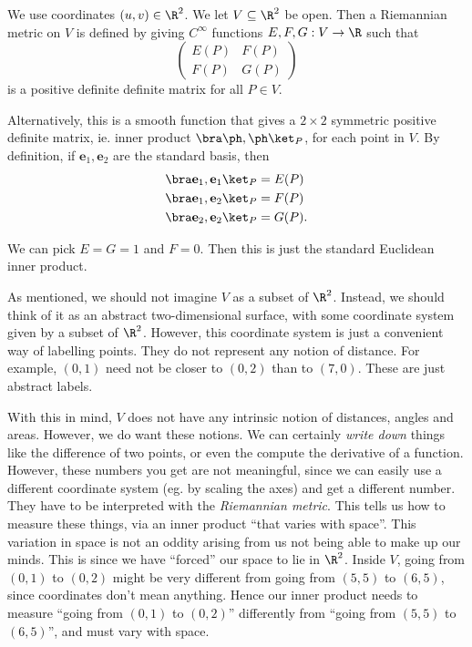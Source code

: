 \documentclass[a4paper]{article}
\begin{document}
\begin{defi}
  We use coordinates $(u, v) \in \R^2$. We let $V \subseteq \R^2$ be open. Then a Riemannian metric on $V$ is defined by giving $C^{\infty}$ functions $E, F, G: V \to \R$ such that
  \[
    \begin{pmatrix}
      E(P) & F(P)\\
      F(P) & G(P)
    \end{pmatrix}
  \]
  is a positive definite definite matrix for all $P \in V$.

  Alternatively, this is a smooth function that gives a $2\times 2$ symmetric positive definite matrix, ie. inner product $\bra \ph, \ph\ket_P$, for each point in $V$. By definition, if $\mathbf{e}_1, \mathbf{e}_2$ are the standard basis, then
  \begin{align*}
    \bra \mathbf{e}_1, \mathbf{e}_1\ket_P &= E(P)\\
    \bra \mathbf{e}_1, \mathbf{e}_2\ket_P &= F(P)\\
    \bra \mathbf{e}_2, \mathbf{e}_2\ket_P &= G(P).
  \end{align*}
\end{defi}
\begin{eg}
  We can pick $E = G = 1$ and $F = 0$. Then this is just the standard Euclidean inner product.
\end{eg}

As mentioned, we should not imagine $V$ as a subset of $\R^2$. Instead, we should think of it as an abstract two-dimensional surface, with some coordinate system given by a subset of $\R^2$. However, this coordinate system is just a convenient way of labelling points. They do not represent any notion of distance. For example, $(0, 1)$ need not be closer to $(0, 2)$ than to $(7, 0)$. These are just abstract labels.

With this in mind, $V$ does not have any intrinsic notion of distances, angles and areas. However, we do want these notions. We can certainly \emph{write down} things like the difference of two points, or even the compute the derivative of a function. However, these numbers you get are not meaningful, since we can easily use a different coordinate system (eg. by scaling the axes) and get a different number. They have to be interpreted with the \emph{Riemannian metric}. This tells us how to measure these things, via an inner product ``that varies with space''. This variation in space is not an oddity arising from us not being able to make up our minds. This is since we have ``forced'' our space to lie in $\R^2$. Inside $V$, going from $(0, 1)$ to $(0, 2)$ might be very different from going from $(5, 5)$ to $(6, 5)$, since coordinates don't mean anything. Hence our inner product needs to measure ``going from $(0, 1)$ to $(0, 2)$'' differently from ``going from $(5, 5)$ to $(6, 5)$'', and must vary with space.
\end{document}
